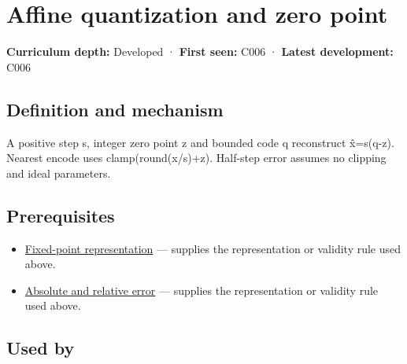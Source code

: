\hypertarget{appendix-d5da3eaabaef}{}\label{referencestart:appendix-d5da3eaabaef}
\section{Affine quantization and zero point}\label{appendix-d5da3eaabaef-affine-quantization-and-zero-point}

\hypertarget{appendix-d5da3eaabaef-affine-quantization-and-zero-point}{}

\textbf{Curriculum depth:} Developed · \textbf{First seen:} C006 · \textbf{Latest development:} C006

\begin{allmightroledefinition}

\subsection{Definition and mechanism}\label{appendix-d5da3eaabaef-definition-and-mechanism}

\hypertarget{appendix-d5da3eaabaef-definition-and-mechanism}{}

A positive step s, integer zero point z and bounded code q reconstruct x̂=s(q-z). Nearest encode uses clamp(round(x/s)+z). Half-step error assumes no clipping and ideal parameters.

\end{allmightroledefinition}

\subsection{Prerequisites}\label{appendix-d5da3eaabaef-prerequisites}

\hypertarget{appendix-d5da3eaabaef-prerequisites}{}

\begin{itemize}
\tightlist
\item
  \hyperref[appendix-1d0dbe8924cc]{Fixed-point representation} --- supplies the representation or validity rule used above.
\item
  \hyperref[appendix-3ae74e89b4e6]{Absolute and relative error} --- supplies the representation or validity rule used above.
\end{itemize}

\subsection{Used by}\label{appendix-d5da3eaabaef-used-by}


